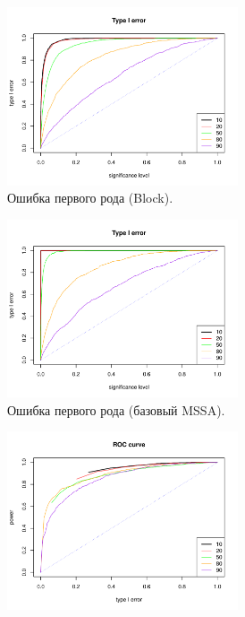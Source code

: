 \documentclass[specialist,
substylefile = spbu_report.rtx,
subf,href,colorlinks=true, 12pt]{disser}
\theoremstyle{definition}
\begin{document}
	\begin{figure}
	\captionsetup[subfigure]{justification=Centering}
	\begin{subfigure}[t]{0.45\textwidth}
		\centering
		\includegraphics[width=0.75\textwidth]{img/type1error_block_fa.pdf}
		\caption{Ошибка первого рода (Block).}
		\label{fig:block_fa_a}
	\end{subfigure}\hspace{\fill}
	\begin{subfigure}[t]{0.45\textwidth}
		\centering
		\includegraphics[width=0.75\textwidth]{img/type1error_mssa_fa.pdf}
		\caption{Ошибка первого рода (базовый MSSA).}
	\end{subfigure}
	\bigskip
	\begin{subfigure}[t]{0.45\textwidth}
		\centering
		\includegraphics[width=0.75\textwidth]{img/roc_block_fa.pdf}

\end{subfigure}
\end{figure}
\end{document}
